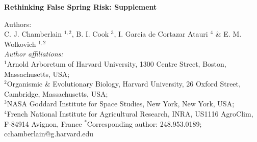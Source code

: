 \documentclass{article}\usepackage[]{graphicx}\usepackage[]{color}
\begin{document}
\noindent \textbf{\large{Rethinking False Spring Risk: Supplement}}

\noindent Authors:\\
C. J. Chamberlain $^{1,2}$, B. I. Cook $^{3}$, I. Garcia de Cortazar Atauri $^{4}$ \& E. M. Wolkovich $^{1,2}$
\vspace{2ex}\\
\emph{Author affiliations:}\\
$^{1}$Arnold Arboretum of Harvard University, 1300 Centre Street, Boston, Massachusetts, USA; \\
$^{2}$Organismic \& Evolutionary Biology, Harvard University, 26 Oxford Street, Cambridge, Massachusetts, USA; \\
$^{3}$NASA Goddard Institute for Space Studies, New York, New York, USA; \\
$^{4}$French National Institute for Agricultural Research, INRA, US1116 AgroClim, F-84914 Avignon, France
\vspace{2ex}
$^*$Corresponding author: 248.953.0189; cchamberlain@g.harvard.edu\\

\renewcommand{\thetable}{S\arabic{table}}
\renewcommand{\thefigure}{S\arabic{figure}}
\renewcommand{\labelitemi}{$-$}

\end{document}
